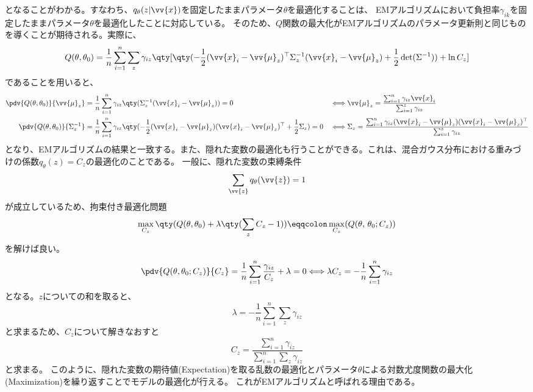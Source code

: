 \documentclass[a4paper,11pt,uplatex]{jsarticle}%
\begin{document}
となることがわかる。すなわち、$q_{\theta}(z|\vv{x})$を固定したままパラメータ$\theta$を最適化することは、
EMアルゴリズムにおいて負担率$\gamma_{ik}$を固定したままパラメータ$\theta$を最適化したことに対応している。
そのため、$Q$関数の最大化がEMアルゴリズムのパラメータ更新則と同じものを導くことが期待される。実際に、
\begin{equation}
  Q(\theta,\theta_0) = \frac{1}{n}\sum_{i=1}^{n}\sum_{z}\gamma_{iz}\qty[\qty(-\frac{1}{2}(\vv{x}_i - \vv{\mu}_z)^{\top}\Sigma_{z}^{-1}(\vv{x}_i-\vv{\mu}_z)+ \frac{1}{2}\det(\Sigma^{-1}))+\ln{C_z}]
\end{equation}
であることを用いると、
\begin{align}
  \pdv{Q(\theta,\theta_0)}{\vv{\mu}_z}    & = \frac{1}{n}\sum_{i=1}^{n}\gamma_{iz}\qty(\Sigma_z^{-1}(\vv{x}_i-\vv{\mu}_z))=0                                                  &  &
  \Longleftrightarrow \vv{\mu}_z = \frac{\sum_{i=1}^{n}\gamma_{iz}\vv{x}_i}{\sum_{i=1}^{z}\gamma_{iz}}                                                                             \\
  \pdv{Q(\theta,\theta_0)}{\Sigma^{-1}_z} & = \frac{1}{n}\sum_{i=1}^{n}\gamma_{iz}\qty(-\frac{1}{2}(\vv{x}_i-\vv{\mu}_z)(\vv{x}_i-\vv{\mu}_z)^{\top} + \frac{1}{2}\Sigma_z)=0 &  &
  \Longleftrightarrow \Sigma_z = \frac{\sum_{i=1}^{n}\gamma_{iz}(\vv{x}_i-\vv{\mu}_z)(\vv{x}_i-\vv{\mu}_z)^{\top}}{\sum_{i=1}^{z}\gamma_{iz}}
\end{align}
となり、EMアルゴリズムの結果と一致する。また、隠れた変数の最適化も行うことができる。これは、混合ガウス分布における重みづけの係数$q_\theta(z)=C_z$の最適化のことである。
一般に、隠れた変数の束縛条件
\begin{equation}
  \sum_{\vv{z}}q_{\theta}(\vv{z}) = 1
\end{equation}
が成立しているため、拘束付き最適化問題
\begin{equation}
  \max_{C_z}\qty(Q(\theta,\theta_0)+\lambda\qty(\sum_{z}C_z-1)) \eqqcolon \max_{C_z}(Q(\theta,\,\theta_0; C_z))
\end{equation}
を解けば良い。
\begin{equation}
  \pdv{Q(\theta,\theta_0;C_z)}{C_z} = \frac{1}{n}\sum_{i=1}^{n}\frac{\gamma_{iz}}{C_z} + \lambda=0
  \Longleftrightarrow \lambda C_z = -\frac{1}{n}\sum_{i=1}^n \gamma_{iz}
\end{equation}
となる。$z$についての和を取ると、
\begin{equation}
  \lambda = -\frac{1}{n}\sum_{i=1}^n \sum_{z}\gamma_{iz}
\end{equation}
と求まるため、$C_z$について解きなおすと
\begin{equation}
  C_z = \frac{\sum_{i=1}^{n}\gamma_{iz}}{\sum_{i=1}^{n}\sum_{z}\gamma_{iz}}
\end{equation}
と求まる。
このように、隠れた変数の期待値(Expectation)を取る乱数の最適化とパラメータ$\theta$による対数尤度関数の最大化(Maximization)を繰り返すことでモデルの最適化が行える。
これがEMアルゴリズムと呼ばれる理由である。
\end{document}
